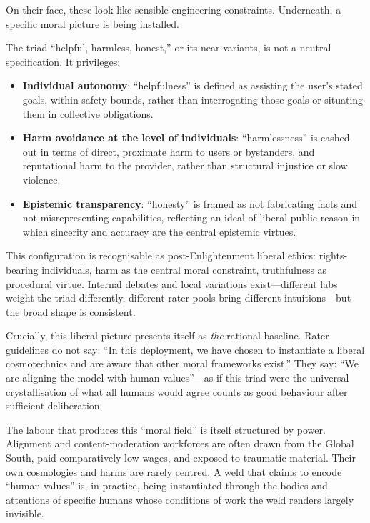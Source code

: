 On their face, these look like sensible engineering constraints. Underneath, a specific moral picture is being installed.

The triad ``helpful, harmless, honest,'' or its near-variants, is not a neutral specification. It privileges:

\begin{itemize}
  \item \textbf{Individual autonomy}: ``helpfulness'' is defined as assisting the user's stated goals, within safety bounds, rather than interrogating those goals or situating them in collective obligations.
  \item \textbf{Harm avoidance at the level of individuals}: ``harmlessness'' is cashed out in terms of direct, proximate harm to users or bystanders, and reputational harm to the provider, rather than structural injustice or slow violence.
  \item \textbf{Epistemic transparency}: ``honesty'' is framed as not fabricating facts and not misrepresenting capabilities, reflecting an ideal of liberal public reason in which sincerity and accuracy are the central epistemic virtues.
\end{itemize}

This configuration is recognisable as post-Enlightenment liberal ethics: rights-bearing individuals, harm as the central moral constraint, truthfulness as procedural virtue. Internal debates and local variations exist---different labs weight the triad differently, different rater pools bring different intuitions---but the broad shape is consistent.

Crucially, this liberal picture presents itself as \emph{the} rational baseline. Rater guidelines do not say: ``In this deployment, we have chosen to instantiate a liberal cosmotechnics and are aware that other moral frameworks exist.'' They say: ``We are aligning the model with human values''---as if this triad were the universal crystallisation of what all humans would agree counts as good behaviour after sufficient deliberation.

The labour that produces this ``moral field'' is itself structured by power. Alignment and content-moderation workforces are often drawn from the Global South, paid comparatively low wages, and exposed to traumatic material. Their own cosmologies and harms are rarely centred. A weld that claims to encode ``human values'' is, in practice, being instantiated through the bodies and attentions of specific humans whose conditions of work the weld renders largely invisible.

